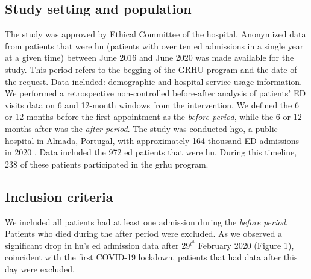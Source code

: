 \documentclass{bmcart}
\begin{document}
\subsection*{Study setting and population}
The study was approved by Ethical Committee of the hospital. 
Anonymized data from patients that were \gls{hu} (patients with over ten \gls{ed} admissions in a single year at a given time) between June 2016 and June 2020 was made available for the study. This period refers to the begging of the GRHU program and the date of the request. Data included: demographic and hospital service usage information. 
We performed a retrospective non-controlled before-after analysis of patients' ED visits data on 6 and 12-month windows from the intervention. We defined the 6 or 12 months before the first appointment as the \textit{before period}, while the 6 or 12 months after was the \textit{after period}.
The study was conducted \gls{hgo}, a public hospital in Almada, Portugal, with approximately 164 thousand ED admissions in 2020 \cite{hospital_garcia_de_orta_relatorio_2020}. 
Data included the 972 \gls{ed} patients that were \gls{hu}. 
During this timeline, 238 of these patients participated in the \gls{grhu} program.

\subsection*{Inclusion criteria}
\label{sec:inclusion}
We included all patients had at least one admission during the \textit{before period}. Patients who died during the after period were excluded. As we observed a significant drop in \gls{hu}'s \gls{ed} admission data after 29$^t^h$ February 2020 (Figure 1), coincident with the first COVID-19 lockdown, patients that had data after this day were excluded. 
\end{document}

